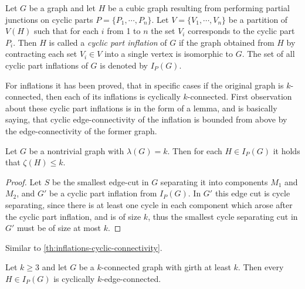 \documentclass[12pt, twoside]{book}
\begin{document}

\begin{definition}
	\label{def:cyclic-part-inflation}
	Let $G$ be a graph and let $H$ be a cubic graph resulting from performing partial junctions on cyclic parts $P=\{P_1,\cdots,P_n\}$. Let $V=\{V_1,\cdots, V_n\}$ be a partition of $V(H)$ such that for each $i$ from 1 to $n$ the set $V_i$ corresponds to the cyclic part $P_i$. Then $H$ is called a \textit{cyclic part inflation} of $G$ if the graph obtained from $H$ by contracting each set $V_i\in V$ into a single vertex is isomorphic to $G$. The set of all cyclic part inflations of $G$ is denoted by $I_P(G)$.
\end{definition}

For inflations it has been proved, that in specific cases if the original graph is $k$-connected, then each of its inflations is cyclically $k$-connected. First observation about these cyclic part inflations is in the form of a lemma, and is basically saying, that cyclic edge-connectivity of the inflation is bounded from above by the edge-connectivity of the former graph.

\begin{lemma}
	Let $G$ be a nontrivial graph with $\lambda(G)=k$. Then for each $H\in I_P(G)$ it holds that $\zeta(H)\leq k$.
\end{lemma}

\begin{proof}
	Let $S$ be the smallest edge-cut in $G$ separating it into components $M_1$ and $M_2$, and $G'$ be a cyclic part inflation from $I_P(G)$. In $G'$ this edge cut is cycle separating, since there is at least one cycle in each component which arose after the cyclic part inflation, and is of size $k$, thus the smallest cycle separating cut in $G'$ must be of size at most $k$.
\end{proof}

Similar to \cref{th:inflations-cyclic-connectivity}.

\begin{theorem}
	Let $k\geq 3$ and let $G$ be a $k$-connected graph with girth at least $k$. Then every  $H\in I_P(G)$ is cyclically $k$-edge-connected.
\end{theorem}
\end{document}

